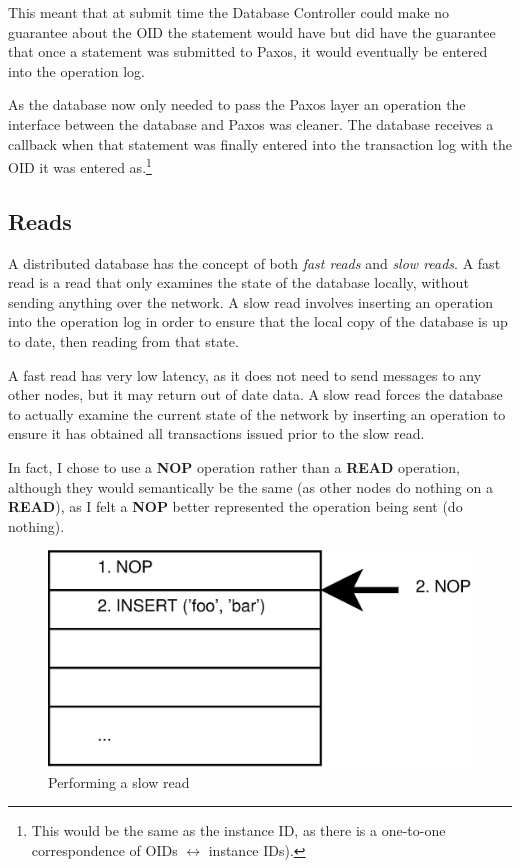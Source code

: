 \documentclass[12pt,twoside,notitlepage]{report}
\newcommand{\op}[1]  {{\bf #1}}         %
\begin{document}
This meant that at submit time the Database Controller could make no guarantee about the OID the
statement would have but did have the guarantee that once a statement was submitted to Paxos, it
would eventually be entered into the operation log.

As the database now only needed to pass the Paxos layer an operation the interface between the
database and Paxos was cleaner.  The database receives a callback when that statement was finally
entered into the transaction log with the OID it was entered as.\footnote{This would be the same
as the instance ID, as there is a one-to-one correspondence of OIDs $\leftrightarrow$ instance IDs).}

\subsection{Reads}

A distributed database has the concept of both \emph{fast reads} and \emph{slow reads}. A fast
read is a read that only examines the state of the database locally, without sending anything over
the network.  A slow read involves inserting an operation into the operation log in order to
ensure that the local copy of the database is up to date, then reading from that state.

A fast read has very low latency, as it does not need to send messages to any other nodes, but it
may return out of date data. A slow read forces the database to actually examine the current state
of the network by inserting an operation to ensure it has obtained all transactions issued
prior to the slow read.

In fact, I chose to use a \op{NOP} operation rather than a \op{READ} operation, although they
would semantically be the same (as other nodes do nothing on a \op{READ}), as I felt a \op{NOP}
better represented the operation being sent (do nothing).

\begin{figure}[htb]
\centering
\includegraphics[scale=0.5]{figs/op-log-slow-read-1.eps}
\caption{\label{fig:op-log-slow-read-1}Performing a slow read}
\end{figure}
\end{document}
